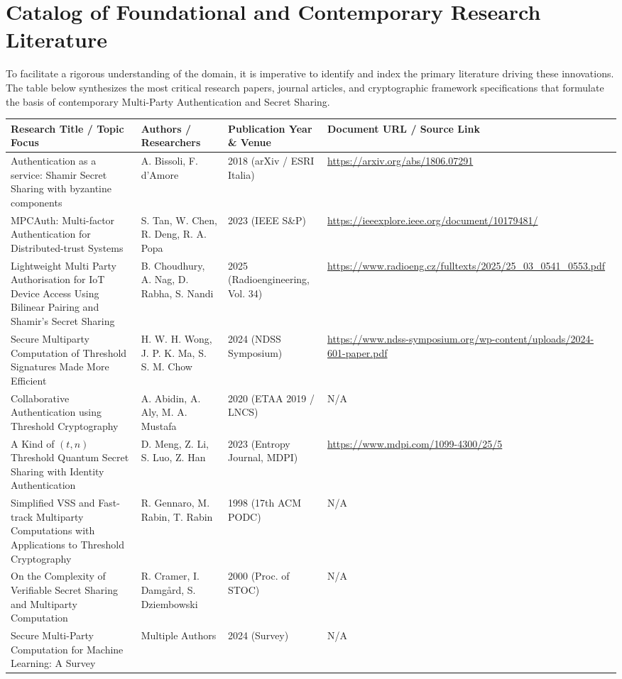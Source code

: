 \documentclass[11pt, a4paper]{article}
\begin{document}
\section*{Catalog of Foundational and Contemporary Research Literature}
To facilitate a rigorous understanding of the domain, it is imperative to identify and index the primary literature driving these innovations. The table below synthesizes the most critical research papers, journal articles, and cryptographic framework specifications that formulate the basis of contemporary Multi-Party Authentication and Secret Sharing.

\begin{table}[h!]
\centering
\small
\begin{tabular}{p{3.5cm} p{3cm} p{2.5cm} p{4cm}}
\toprule
\textbf{Research Title / Topic Focus} & \textbf{Authors / Researchers} & \textbf{Publication Year \& Venue} & \textbf{Document URL / Source Link} \\
\midrule
Authentication as a service: Shamir Secret Sharing with byzantine components & A. Bissoli, F. d'Amore & 2018 (arXiv / ESRI Italia) & \url{https://arxiv.org/abs/1806.07291} \\
MPCAuth: Multi-factor Authentication for Distributed-trust Systems & S. Tan, W. Chen, R. Deng, R. A. Popa & 2023 (IEEE S\&P) & \url{https://ieeexplore.ieee.org/document/10179481/} \\
Lightweight Multi Party Authorisation for IoT Device Access Using Bilinear Pairing and Shamir's Secret Sharing & B. Choudhury, A. Nag, D. Rabha, S. Nandi & 2025 (Radioengineering, Vol. 34) & \url{https://www.radioeng.cz/fulltexts/2025/25_03_0541_0553.pdf} \\
Secure Multiparty Computation of Threshold Signatures Made More Efficient & H. W. H. Wong, J. P. K. Ma, S. S. M. Chow & 2024 (NDSS Symposium) & \url{https://www.ndss-symposium.org/wp-content/uploads/2024-601-paper.pdf} \\
Collaborative Authentication using Threshold Cryptography & A. Abidin, A. Aly, M. A. Mustafa & 2020 (ETAA 2019 / LNCS) & N/A \\
A Kind of $(t, n)$ Threshold Quantum Secret Sharing with Identity Authentication & D. Meng, Z. Li, S. Luo, Z. Han & 2023 (Entropy Journal, MDPI) & \url{https://www.mdpi.com/1099-4300/25/5} \\
Simplified VSS and Fast-track Multiparty Computations with Applications to Threshold Cryptography & R. Gennaro, M. Rabin, T. Rabin & 1998 (17th ACM PODC) & N/A \\
On the Complexity of Verifiable Secret Sharing and Multiparty Computation & R. Cramer, I. Damgård, S. Dziembowski & 2000 (Proc. of STOC) & N/A \\
Secure Multi-Party Computation for Machine Learning: A Survey & Multiple Authors & 2024 (Survey) & N/A \\
\bottomrule
\end{tabular}
\end{table}
\end{document}
